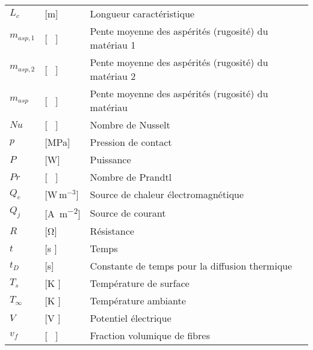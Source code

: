 \begin{longtable}{l p{2.5cm} p{4in}}
	$L_c$            & [\si{\metre}]                                       & Longueur caractéristique                                     \\
	$m_{asp,1}$      & [ \ ]                                               & Pente moyenne des aspérités (rugosité) du matériau 1         \\
	$m_{asp,2}$      & [ \ ]                                               & Pente moyenne des aspérités (rugosité) du matériau 2         \\
	$m_{asp}$        & [ \ ]                                               & Pente moyenne des aspérités (rugosité) du matériau           \\
	$Nu$             & [ \ ]                                               & Nombre de Nusselt                                            \\
	$p$              & [\si{\mega\pascal}]                                 & Pression de contact                                          \\
	$P$              & [\si{\watt}]                                        & Puissance                                                    \\
	$Pr$             & [ \ ]                                               & Nombre de Prandtl                                            \\
	$Q_e$            & [W\,m$^{-3}$]                                       & Source de chaleur électromagnétique                          \\
	$Q_j$            & [\si{\ampere\per\square\metre}]                     & Source de courant                                            \\
	$R$              & [\si{\ohm}]                                         & Résistance                                                   \\
	$t$              & [\si{\second} ]                                     & Temps                                                        \\
	$t_D$            & [\si{\second}]                                      & Constante de temps pour la diffusion thermique               \\
	$T_s$            & [\si{\kelvin} ]                                     & Température de surface                                       \\
	$T_{\infty}$     & [\si{\kelvin} ]                                     & Température ambiante                                         \\
	$V$              & [\si{\volt} ]                                       & Potentiel électrique                                         \\
	$v_f$            & [ \ ]                                               & Fraction volumique de fibres
\end{longtable}
